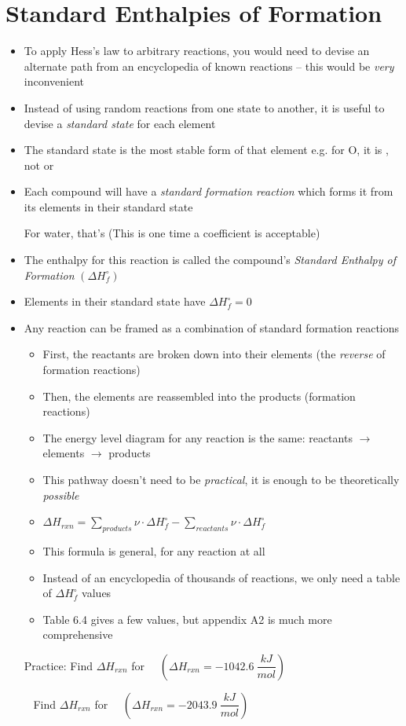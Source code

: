 \documentclass[12pt, openany, letterpaper]{memoir}
\begin{document}
\section{Standard Enthalpies of Formation}
\begin{itemize}
	\item To apply Hess's law to arbitrary reactions, you would need to devise an alternate path from an encyclopedia of known reactions -- this would be \emph{very} inconvenient
	\item Instead of using random reactions from one state to another, it is useful to devise a \emph{standard state} for each element
	\item The standard state is the most stable form of that element e.g. for O, it is , not  or 
	\item Each compound will have a \emph{standard formation reaction} which forms it from its elements in their standard state
	
	For water, that's  \hspace{1em} (This is one time a  coefficient is acceptable)
	\item The enthalpy for this reaction is called the compound's \emph{Standard Enthalpy of Formation} $\left(\Delta H^\circ_f\right)$
	\item Elements in their standard state have $\Delta H^\circ_f = 0$
	\item Any reaction can be framed as a combination of standard formation reactions
	\begin{itemize}
		\item First, the reactants are broken down into their elements (the \emph{reverse} of formation reactions)
		\item Then, the elements are reassembled into the products (formation reactions)
		\item The energy level diagram for any reaction is the same: reactants $\rightarrow$ elements $\rightarrow$ products
		\item This pathway doesn't need to be \emph{practical}, it is enough to be theoretically \emph{possible}
		\item $\Delta H_{rxn}=\sum\limits_{products}\nu\cdot\Delta H^\circ_f - \sum\limits_{reactants}\nu\cdot\Delta H^\circ_f$
		\item This formula is general, for any reaction at all
		\item Instead of an encyclopedia of thousands of reactions, we only need a table of $\Delta H^\circ_f$ values
		\item Table 6.4 gives a few values, but appendix A2 is much more comprehensive
	\end{itemize}
	Practice: Find $\Delta H_{rxn}$ for~~  \hspace{1em} $\left(\Delta H_{rxn}=-1042.6~\dfrac{kJ}{mol}\right)$
	
	~\hphantom{Practice:} Find $\Delta H_{rxn}$ for~~  \hspace{1em} $\left(\Delta H_{rxn}=-2043.9~\dfrac{kJ}{mol}\right)$
\end{itemize}
\end{document}
